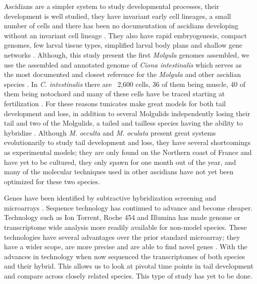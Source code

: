 Ascidians are a simpler system to study developmental processes, their development is well studied, they have invariant early cell lineages, a small number of cells \cite{lemaire_evolutionary_2011} and there has been no documentation of ascidians developing without an invariant cell lineage \cite{lemaire_ascidians_2008}. They also have rapid embryogenesis, compact genomes, few larval tissue types, simplified larval body plans and shallow gene networks \cite{corbo_characterization_1997,jeffery_minireview_2002,dehal_draft_2002}. Although, this study present the first \textit{Molgula} genomes assembled, we use the assembled and annotated genome of \textit{Ciona intestinalis} which serves as the most documented and closest reference for the \textit{Molgula} and other ascidian species \cite{dehal_draft_2002,satoh_ascidian_2003,satoh_ciona_2003}. In \textit{C. intestinalis} there are ~2,600 cells, 36 of them being muscle, 40 of them being notochord and many of these cells have be traced starting at fertilization \cite{nishida_cell_1983}. For these reasons tunicates make great models for both tail development and loss, in addition to several Molgulids independently losing their tail and two of the Molgulids, a tailed and tailless species having the ability to hybridize \cite{jeffery_evolutionary_1991}. Although \textit{M. occulta} and \textit{M. oculata} present great systems evolutionarily to study tail development and loss, they have several shortcomings as experimental models; they are only found on the Northern coast of France and have yet to be cultured, they only spawn for one month out of the year, and many of the molecular techniques used in other ascidians have not yet been optimized for these two species.

Genes have been identified by subtractive hybridization screening and microarrays \cite{jeffery_factors_1992,hotta_characterization_2000,gyoja_analysis_2007,kobayashi_differential_2013}. Sequence technology has continued to advance and become cheaper. Technology such as Ion Torrent, Roche 454 and Illumina has made genome or transcriptome wide analysis more readily available for non-model species. These technologies have several advantages over the prior standard microarray; they have a wider scope, are more precise and are able to find novel genes \cite{marioni_rna-seq:_2008}. With the advances in technology when now sequenced the transcriptomes of both species and their hybrid. This allows us to look at pivotal time points in tail development and compare across closely related species. This type of study has yet to be done. 

